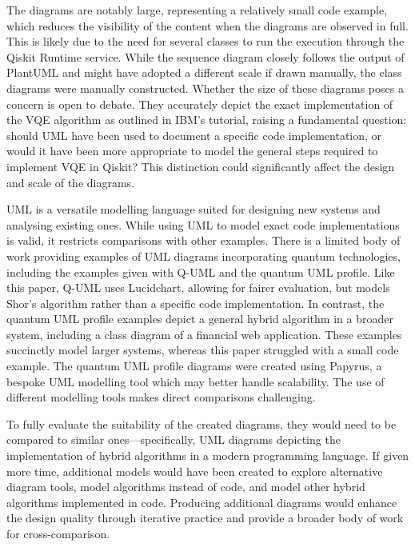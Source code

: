 \documentclass{article}
\begin{document}
The diagrams are notably large, representing a relatively small code example, which reduces the visibility of the content when the diagrams are observed in full. This is likely due to the need for several classes to run the execution through the Qiskit Runtime service. While the sequence diagram closely follows the output of PlantUML and might have adopted a different scale if drawn manually, the class diagrams were manually constructed. Whether the size of these diagrams poses a concern is open to debate. They accurately depict the exact implementation of the VQE algorithm as outlined in IBM's tutorial, raising a fundamental question: should UML have been used to document a specific code implementation, or would it have been more appropriate to model the general steps required to implement VQE in Qiskit? This distinction could significantly affect the design and scale of the diagrams.

UML is a versatile modelling language suited for designing new systems and analysing existing ones. While using UML to model exact code implementations is valid, it restricts comparisons with other examples. There is a limited body of work providing examples of UML diagrams incorporating quantum technologies, including the examples given with Q-UML and the quantum UML profile\cite{xiewu}\cite{Jiménez-Navajas2024}. Like this paper, Q-UML uses Lucidchart, allowing for fairer evaluation, but models Shor's algorithm rather than a specific code implementation. In contrast, the quantum UML profile examples depict a general hybrid algorithm in a broader system, including a class diagram of a financial web application\cite{Pérez-Castillo2022}. These examples succinctly model larger systems, whereas this paper struggled with a small code example. The quantum UML profile diagrams were created using Papyrus, a bespoke UML modelling tool which may better handle scalability. The use of different modelling tools makes direct comparisons challenging.

To fully evaluate the suitability of the created diagrams, they would need to be compared to similar ones—specifically, UML diagrams depicting the implementation of hybrid algorithms in a modern programming language. If given more time, additional models would have been created to explore alternative diagram tools, model algorithms instead of code, and model other hybrid algorithms implemented in code. Producing additional diagrams would enhance the design quality through iterative practice and provide a broader body of work for cross-comparison.
\end{document}
